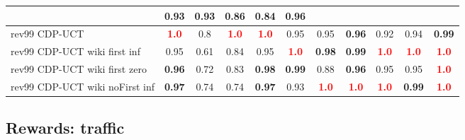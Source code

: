 \documentclass{article}
\begin{document}
\begin{tabular}{|l|r@{$\pm$}rr@{$\pm$}rr@{$\pm$}rr@{$\pm$}rr@{$\pm$}rr@{$\pm$}rr@{$\pm$}rr@{$\pm$}rr@{$\pm$}rr@{$\pm$}r|}
& \multicolumn{2}{c}{0.93}
& \multicolumn{2}{c}{0.93}
& \multicolumn{2}{c}{0.86}
& \multicolumn{2}{c}{0.84}
& \multicolumn{2}{c|}{0.96}
\\
\hline
rev99 CDP-UCT
& \multicolumn{2}{c}{\textbf{\textcolor{red}{1.0}}}
& \multicolumn{2}{c}{0.8}
& \multicolumn{2}{c}{\textbf{\textcolor{red}{1.0}}}
& \multicolumn{2}{c}{\textbf{\textcolor{red}{1.0}}}
& \multicolumn{2}{c}{0.95}
& \multicolumn{2}{c}{0.95}
& \multicolumn{2}{c}{\textbf{0.96}}
& \multicolumn{2}{c}{0.92}
& \multicolumn{2}{c}{0.94}
& \multicolumn{2}{c|}{\textbf{0.99}}
\\
rev99 CDP-UCT wiki first inf
& \multicolumn{2}{c}{0.95}
& \multicolumn{2}{c}{0.61}
& \multicolumn{2}{c}{0.84}
& \multicolumn{2}{c}{0.95}
& \multicolumn{2}{c}{\textbf{\textcolor{red}{1.0}}}
& \multicolumn{2}{c}{\textbf{0.98}}
& \multicolumn{2}{c}{\textbf{0.99}}
& \multicolumn{2}{c}{\textbf{\textcolor{red}{1.0}}}
& \multicolumn{2}{c}{\textbf{\textcolor{red}{1.0}}}
& \multicolumn{2}{c|}{\textbf{\textcolor{red}{1.0}}}
\\
rev99 CDP-UCT wiki first zero
& \multicolumn{2}{c}{\textbf{0.96}}
& \multicolumn{2}{c}{0.72}
& \multicolumn{2}{c}{0.83}
& \multicolumn{2}{c}{\textbf{0.98}}
& \multicolumn{2}{c}{\textbf{0.99}}
& \multicolumn{2}{c}{0.88}
& \multicolumn{2}{c}{\textbf{0.96}}
& \multicolumn{2}{c}{0.95}
& \multicolumn{2}{c}{0.95}
& \multicolumn{2}{c|}{\textbf{\textcolor{red}{1.0}}}
\\
rev99 CDP-UCT wiki noFirst inf
& \multicolumn{2}{c}{\textbf{0.97}}
& \multicolumn{2}{c}{0.74}
& \multicolumn{2}{c}{0.74}
& \multicolumn{2}{c}{\textbf{0.97}}
& \multicolumn{2}{c}{0.93}
& \multicolumn{2}{c}{\textbf{\textcolor{red}{1.0}}}
& \multicolumn{2}{c}{\textbf{\textcolor{red}{1.0}}}
& \multicolumn{2}{c}{\textbf{\textcolor{red}{1.0}}}
& \multicolumn{2}{c}{\textbf{0.99}}
& \multicolumn{2}{c|}{\textbf{\textcolor{red}{1.0}}}
\\
\hline
\end{tabular}%

\bigskip

\subsection*{Rewards: traffic}
\end{document}
